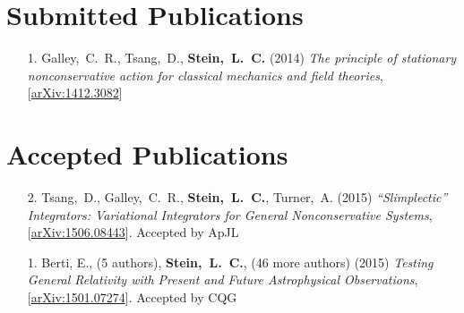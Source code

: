 \section{\sc Submitted Publications}
\begin{enumerate}
\item[{1.}] Galley,~C.~R., Tsang,~D., {\bf Stein,~L.~C.} (2014)
  {\it The principle of stationary nonconservative action for
    classical mechanics and field theories},
  [\href{http://arxiv.org/abs/1412.3082}{arXiv:1412.3082}]
\end{enumerate}

\section{\sc Accepted Publications}
\begin{enumerate}
\item[{2.}] Tsang,~D., Galley,~C.~R., {\bf Stein,~L.~C.}, Turner,~A. (2015)
  {\it ``Slimplectic'' Integrators: Variational Integrators for General Nonconservative Systems},
  [\href{http://arxiv.org/abs/1506.08443}{arXiv:1506.08443}]. Accepted
  by ApJL
\item[{1.}] Berti, E., (5 authors), {\bf Stein,~L.~C.}, (46 more authors) (2015)
  {\it Testing General Relativity with Present and Future
    Astrophysical Observations},
  [\href{http://arxiv.org/abs/1501.07274}{arXiv:1501.07274}].
  Accepted by CQG
\end{enumerate}


